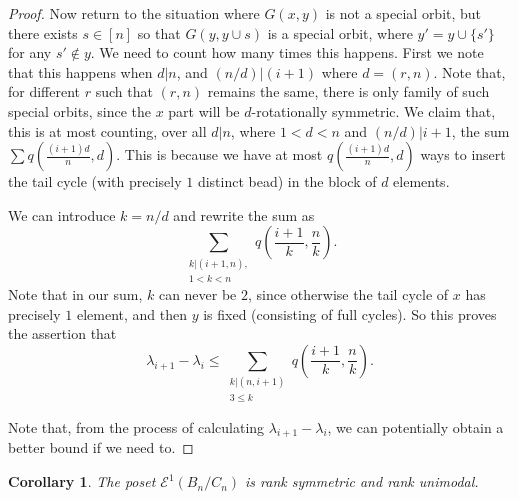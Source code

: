 \documentclass[10 pt]{amsart}
\theoremstyle{plain}
\newtheorem{cor}[thm]{Corollary}
\theoremstyle{definition}
\theoremstyle{remark}
\numberwithin{equation}{section}
\newcommand{\dstyle}{\displaystyle}
\begin{document}
\begin{proof}
Now return to the situation where $G{(x , y)}$ is not a special orbit, but there exists $s \in [n]$ so that $G{(y , y \cup s)}$ is a special orbit, where $y' = y \cup \{s'\}$ for any $s' \notin y$. We need to count how many times this happens.  First we note that this happens when $d | n$, and $(n/d) | (i+1)$ where $d = (r, n)$. Note that, for different $r$ such that $(r, n)$ remains the same, there is only family of such special orbits, since the $x$ part will be $d$-rotationally symmetric.  We claim that, this  is at most counting,  over all $d | n$, where $1 < d < n$ and $(n/d) | i+1 $, the sum $\dstyle \sum q \left(\frac{(i+1)d}{n}, d\right)$.  This is because we have at most $q(\frac{(i+1)d}{n}, d)$ ways to insert the tail cycle (with precisely $1$ distinct bead) in the block of $d$ elements. 

We can introduce $k = n/d$  and rewrite the sum as 
$$\sum_{\substack{k | (i+1, n), \\ 1 < k < n}} q\left(\frac{i+1}{k}, \frac{n}{k}\right).$$ Note that in our sum, $k$ can never be $2$, since otherwise the tail cycle of $x$  has precisely $1$ element, and then $y$ is fixed (consisting of full cycles). So this proves the assertion that $$\lambda_{i+1} - \lambda_i \le \sum_{\substack{k | (n , i+1) \\ 3 \le k }} q (\frac{i+1}{k}, \frac{n}{k}). $$ 
 
Note that, from the process of calculating $\lambda_{i+1} - \lambda_{i}$, we can potentially obtain a better bound   if we need to. 
\end{proof}
\begin{cor}{\label{cor:cyclic_unimodal}} 
The poset $\mathcal E^1(B_n/C_n)$ is rank symmetric and rank unimodal.
\end{cor}
\end{document}
